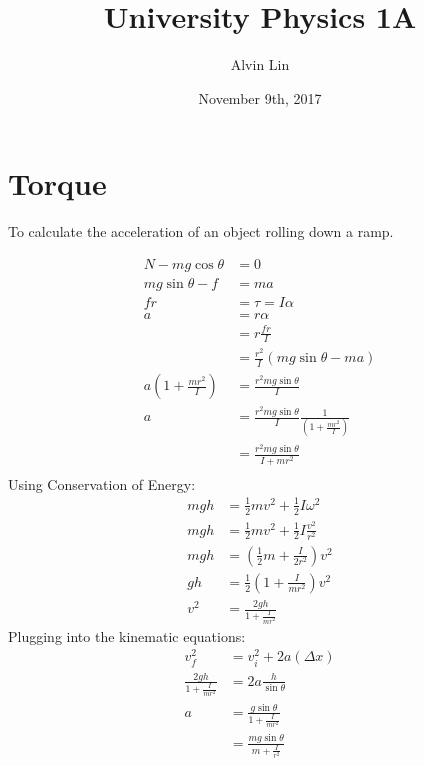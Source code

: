\documentclass{math}
\title{University Physics 1A}
\author{Alvin Lin}
\date{November 9th, 2017}
\begin{document}
\maketitle

\section*{Torque}
To calculate the acceleration of an object rolling down a ramp.
\begin{center}
\end{center}
\begin{align*}
  N-mg\cos\theta &= 0 \\
  mg\sin\theta-f &= ma \\
  fr &= \tau = I\alpha \\
  a &= r\alpha \\
  &= r\frac{fr}{I} \\
  &= \frac{r^2}{I}(mg\sin\theta-ma) \\
  a(1+\frac{mr^2}{I}) &= \frac{r^2mg\sin\theta}{I} \\
  a &= \frac{r^2mg\sin\theta}{I}\frac{1}{(1+\frac{mr^2}{I})} \\
  &= \frac{r^2mg\sin\theta}{I+mr^2} \\
\end{align*}
Using Conservation of Energy:
\begin{align*}
  mgh &= \frac{1}{2}mv^2+\frac{1}{2}I\omega^2 \\
  mgh &= \frac{1}{2}mv^2+\frac{1}{2}I\frac{v^2}{r^2} \\
  mgh &= \left(\frac{1}{2}m+\frac{I}{2r^2}\right)v^2 \\
  gh &= \frac{1}{2}(1+\frac{I}{mr^2})v^2 \\
  v^2 &= \frac{2gh}{1+\frac{I}{mr^2}}
\end{align*}
Plugging into the kinematic equations:
\begin{align*}
  v_f^2 &= v_i^2+2a(\Delta x) \\
  \frac{2gh}{1+\frac{I}{mr^2}} &= 2a\frac{h}{\sin\theta} \\
  a &= \frac{g\sin\theta}{1+\frac{I}{mr^2}} \\
  &= \frac{mg\sin\theta}{m+\frac{I}{r^2}}
\end{align*}
\end{document}
